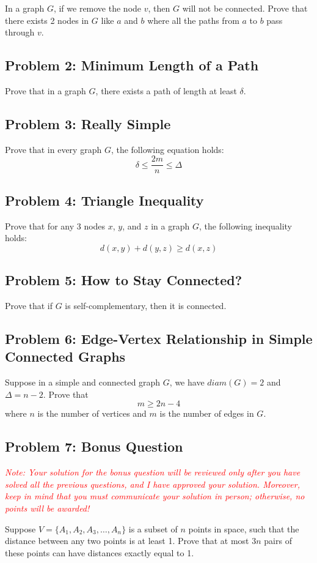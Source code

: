 \documentclass{article}
\begin{document}
In a graph $G$, if we remove the node $v$, then $G$ will not be connected. Prove that there exists 2 nodes in $G$ like $a$ and $b$ where all the paths from $a$ to $b$ pass through $v$.


\subsection*{Problem 2: Minimum Length of a Path}
Prove that in a graph $G$, there exists a path of length at least $\delta$.

\subsection*{Problem 3: Really Simple}
Prove that in every graph $G$, the following equation holds:
\begin{equation*}
\delta \le \frac{2m}{n} \le \Delta
\end{equation*}

\subsection*{Problem 4: Triangle Inequality}
Prove that for any 3 nodes $x$, $y$, and $z$ in a graph $G$, the following inequality holds:
\begin{equation*}
d(x,y) + d(y,z) \ge d(x,z)
\end{equation*}

\subsection*{Problem 5: How to Stay Connected?}
Prove that if $G$ is self-complementary, then it is connected.

\subsection*{Problem 6: Edge-Vertex Relationship in Simple Connected Graphs}
Suppose in a simple and connected graph $G$, we have $diam(G) = 2$ and $\Delta = n - 2$. Prove that
\begin{equation*}
m \ge 2n - 4
\end{equation*}
where $n$ is the number of vertices and $m$ is the number of edges in $G$.

\subsection*{Problem 7: Bonus Question}
\textcolor{red}{\textit{Note: Your solution for the bonus question will be reviewed only after you have solved all the previous questions, and I have approved your solution. Moreover, keep in mind that you must communicate your solution in person; otherwise, no points will be awarded!}}

Suppose $V = \{A_1, A_2, A_3, \ldots, A_n\}$ is a subset of $n$ points in space, such that the distance between any two points is at least 1. Prove that at most $3n$ pairs of these points can have distances exactly equal to 1.
\end{document}
